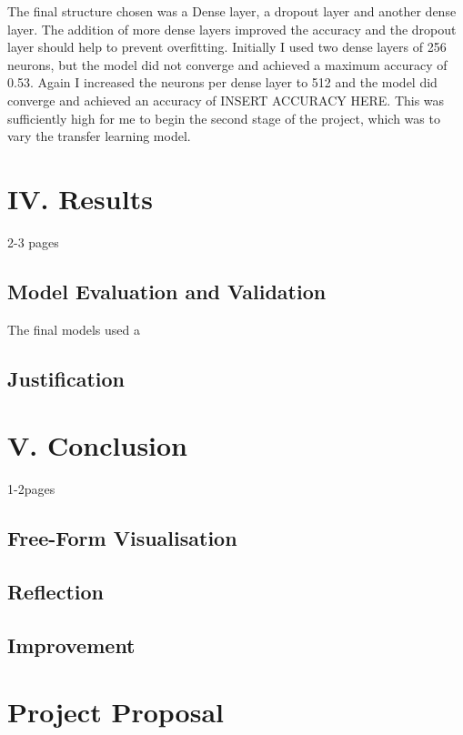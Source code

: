 \documentclass{article}
\begin{document}
The final structure chosen was a Dense layer, a dropout layer and another dense layer. The addition of more dense layers improved the accuracy and the dropout layer should help to prevent overfitting. Initially I used two dense layers of 256 neurons, but the model did not converge and achieved a maximum accuracy of 0.53. Again I increased the neurons per dense layer to 512 and the model did converge and achieved an accuracy of INSERT ACCURACY HERE. This was sufficiently high for me to begin the second stage of the project, which was to vary the transfer learning model. 

\section{IV. Results}
2-3 pages
\subsection{Model Evaluation and Validation}
The final models used a 
\subsection{Justification}

\section{V. Conclusion}
1-2pages
\subsection{Free-Form Visualisation}
\subsection{Reflection}
\subsection{Improvement}



\newpage{}
\section{Project Proposal}
\end{document}
